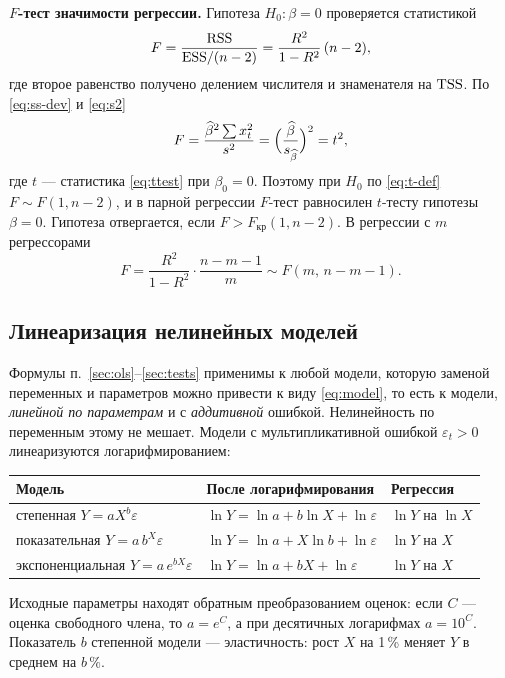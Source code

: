 \textbf{$F$-тест значимости регрессии.} Гипотеза $H_0\colon \beta = 0$
проверяется статистикой
\begin{equation}
  F = \frac{\mathrm{RSS}}{\mathrm{ESS}/(n-2)} = \frac{R^2}{1-R^2}\,(n-2),
  \label{eq:ftest}
\end{equation}
где второе равенство получено делением числителя и знаменателя на $\mathrm{TSS}$. По
\eqref{eq:ss-dev} и \eqref{eq:s2}
\[
  F = \frac{\widehat{\beta}^2\sum x_t^2}{s^2} = \Bigl(\frac{\widehat{\beta}}{s_{\widehat{\beta}}}\Bigr)^2 = t^2,
\]
где $t$ — статистика \eqref{eq:ttest} при $\beta_0 = 0$. Поэтому при $H_0$ по
\eqref{eq:t-def} $F \sim F(1, n-2)$, и в парной регрессии $F$-тест равносилен
$t$-тесту гипотезы $\beta = 0$. Гипотеза отвергается, если
$F > F_{\text{кр}}(1, n-2)$. В регрессии с $m$ регрессорами
\[
  F = \frac{R^2}{1-R^2}\cdot\frac{n-m-1}{m} \sim F(m,\, n-m-1).
\]

\subsection{Линеаризация нелинейных моделей}\label{sec:linear}

Формулы п.~\ref{sec:ols}--\ref{sec:tests} применимы к любой модели, которую
заменой переменных и параметров можно привести к виду \eqref{eq:model}, то есть
к модели, \emph{линейной по параметрам} и с \emph{аддитивной} ошибкой.
Нелинейность по переменным этому не мешает. Модели с мультипликативной ошибкой
$\varepsilon_t > 0$ линеаризуются логарифмированием:
\begin{center}
\begin{tabular}{lll}
\toprule
Модель & После логарифмирования & Регрессия \\
\midrule
степенная $Y = aX^{b}\varepsilon$
  & $\ln Y = \ln a + b\ln X + \ln\varepsilon$ & $\ln Y$ на $\ln X$ \\
показательная $Y = a\,b^{X}\varepsilon$
  & $\ln Y = \ln a + X\ln b + \ln\varepsilon$ & $\ln Y$ на $X$ \\
экспоненциальная $Y = a\,e^{bX}\varepsilon$
  & $\ln Y = \ln a + bX + \ln\varepsilon$ & $\ln Y$ на $X$ \\
\bottomrule
\end{tabular}
\end{center}
Исходные параметры находят обратным преобразованием оценок: если $C$ — оценка
свободного члена, то $a = e^{C}$, а при десятичных логарифмах $a = 10^{C}$.
Показатель $b$ степенной модели — эластичность: рост $X$ на 1\,\% меняет $Y$ в
среднем на $b\,\%$.

